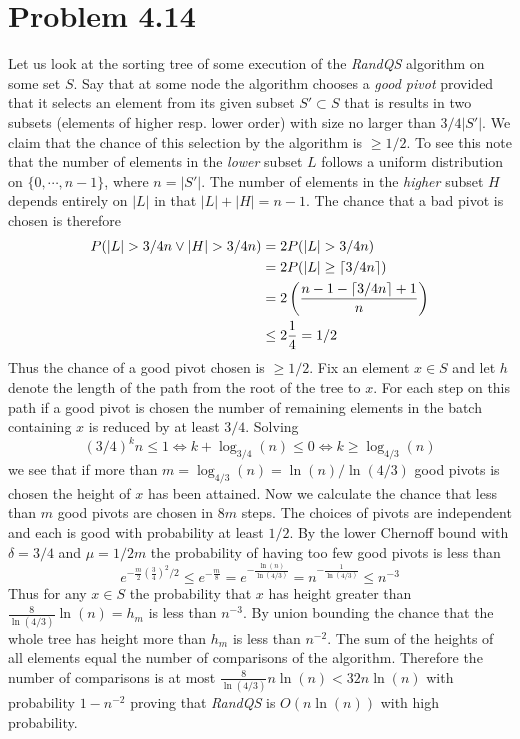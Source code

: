 \section*{Problem 4.14}

Let us look at the sorting tree of some execution of the \emph{RandQS} algorithm on some set $S$.
Say that at some node the algorithm chooses a \emph{good pivot} provided that it selects an element from its given subset $S' \subset S$ that is results in two subsets (elements of higher resp. lower order) with size no larger than $3/4 |S'|$.
We claim that the chance of this selection by the algorithm is $\geq 1/2$.
To see this note that the number of elements in the \emph{lower} subset $L$ follows a uniform distribution on $\{0,\cdots,n-1\}$, where $n = |S'|$.
The number of elements in the \emph{higher} subset $H$ depends entirely on $|L|$ in that $|L| + |H| = n-1$.
The chance that a bad pivot is chosen is therefore
\begin{align*}
  P(|L|>3/4 n \lor |H|>3/4 n) &= 2 P(|L|>3/4 n)
  \\ &= 2 P(|L| \geq \ceil{3/4 n})
  \\ &= 2 \left(\frac{n-1 - \ceil{3/4 n} + 1}{n} \right)
  \\ &\leq 2 \frac{1}{4} = 1/2
\end{align*}
Thus the chance of a good pivot chosen is $\geq 1/2$.
Fix an element $x \in S$ and let $h$ denote the length of the path from the root of the tree to $x$.
For each step on this path if a good pivot is chosen the number of remaining elements in the batch containing $x$ is reduced by at least $3/4$.
Solving
\[(3/4)^k n \leq 1 \iff k + \log_{3/4}(n) \leq 0 \iff k \geq \log_{4/3}(n) \]
we see that if more than $m = \log_{4/3}(n) = \ln(n) / \ln(4/3) $ good pivots is chosen the height of $x$ has been attained.
Now we calculate the chance that less than $m$ good pivots are chosen in $8 m$ steps.
The choices of pivots are independent and each is good with probability at least $1/2$.
By the lower Chernoff bound with $\delta = 3/4$ and $\mu = 1/2 m$ the probability of having too few good pivots is less than 
\[ e^{-\frac{m}{2} \left(\frac{3}{4}\right)^2 / 2} \leq e^{-\frac{m}{8}} = e^{-\frac{\ln(n)}{\ln(4/3)}} = n^{-\frac{1}{\ln(4/3)}} \leq n^{-3} \] 
Thus for any $x \in S$ the probability that $x$ has height greater than $\frac{8}{\ln(4/3)} \ln(n) = h_m$ is less than $n^{-3}$.
By union bounding the chance that the whole tree has height more than $h_m$ is less than $n^{-2}$. 
The sum of the heights of all elements equal the number of comparisons of the algorithm.
Therefore the number of comparisons is at most $\frac{8}{\ln(4/3)} n \ln(n) < 32 n \ln(n)$ with probability $1 - n^{-2}$ proving that \emph{RandQS} is $O(n \ln(n))$ with high probability. 
